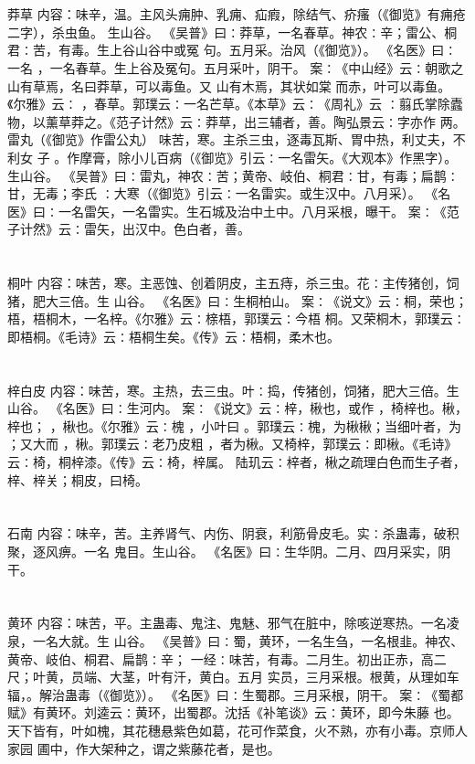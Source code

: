 \documentclass[12pt,UTF8]{ctexbook}
\begin{document}
\section{}莽草
内容：味辛，温。主风头痈肿、乳痈、疝瘕，除结气、疥瘙（《御览》有痈疮二字），杀虫鱼。 
生山谷。 
《吴普》曰∶莽草，一名春草。神农∶辛；雷公、桐君∶苦，有毒。生上谷山谷中或冤 
句。五月采。治风（《御览》）。 
《名医》曰∶一名 ，一名春草。生上谷及冤句。五月采叶，阴干。 
案∶《中山经》云∶朝歌之山有草焉，名曰莽草，可以毒鱼。又 山有木焉，其状如棠 
而赤，叶可以毒鱼。《尔雅》云∶ ，春草。郭璞云∶一名芒草。《本草》云∶《周礼》云 
∶翦氏掌除蠹物，以薰草莽之。《范子计然》云∶莽草，出三辅者，善。陶弘景云∶字亦作 
两。 
雷丸（《御览》作雷公丸） 味苦，寒。主杀三虫，逐毒瓦斯、胃中热，利丈夫，不利女 
子 
。作摩膏，除小儿百病（《御览》引云∶一名雷矢。《大观本》作黑字）。生山谷。 
《吴普》曰∶雷丸，神农∶苦；黄帝、岐伯、桐君∶甘，有毒；扁鹊∶甘，无毒；李氏 
∶大寒（《御览》引云∶一名雷实。或生汉中。八月采）。 
《名医》曰∶一名雷矢，一名雷实。生石城及治中土中。八月采根，曝干。 
案∶《范子计然》云∶雷矢，出汉中。色白者，善。 


\section{}桐叶
内容：味苦，寒。主恶蚀、创着阴皮，主五痔，杀三虫。花∶主传猪创，饲猪，肥大三倍。生 
山谷。 
《名医》曰∶生桐柏山。 
案∶《说文》云∶桐，荣也；梧，梧桐木，一名梓。《尔雅》云∶榇梧，郭璞云∶今梧 
桐。又荣桐木，郭璞云∶即梧桐。《毛诗》云∶梧桐生矣。《传》云∶梧桐，柔木也。 


\section{}梓白皮
内容：味苦，寒。主热，去三虫。叶∶捣，传猪创，饲猪，肥大三倍。生山谷。 
《名医》曰∶生河内。 
案∶《说文》云∶梓，楸也，或作 ，椅梓也。楸，梓也； ，楸也。《尔雅》云∶槐 
，小叶曰 。郭璞云∶槐，为楸楸；当细叶者，为 ；又大而 ，楸。郭璞云∶老乃皮粗 
，者为楸。又椅梓，郭璞云∶即楸。《毛诗》云∶椅，桐梓漆。《传》云∶椅，梓属。 
陆玑云∶梓者，楸之疏理白色而生子者，梓、梓关；桐皮，曰椅。 


\section{}石南
内容：味辛，苦。主养肾气、内伤、阴衰，利筋骨皮毛。实∶杀蛊毒，破积聚，逐风痹。一名 
鬼目。生山谷。 
《名医》曰∶生华阴。二月、四月采实，阴干。 


\section{}黄环
内容：味苦，平。主蛊毒、鬼注、鬼魅、邪气在脏中，除咳逆寒热。一名凌泉，一名大就。生 
山谷。 
《吴普》曰∶蜀，黄环，一名生刍，一名根韭。神农、黄帝、岐伯、桐君、扁鹊∶辛； 
一经∶味苦，有毒。二月生。初出正赤，高二尺；叶黄，员端、大茎，叶有汗，黄白。五月 
实员，三月采根。根黄，从理如车辐，。解治蛊毒（《御览》）。 
《名医》曰∶生蜀郡。三月采根，阴干。 
案∶《蜀都赋》有黄环。刘逵云∶黄环，出蜀郡。沈括《补笔谈》云∶黄环，即今朱藤 
也。天下皆有，叶如槐，其花穗悬紫色如葛，花可作菜食，火不熟，亦有小毒。京师人家园 
圃中，作大架种之，谓之紫藤花者，是也。 
\end{document}
